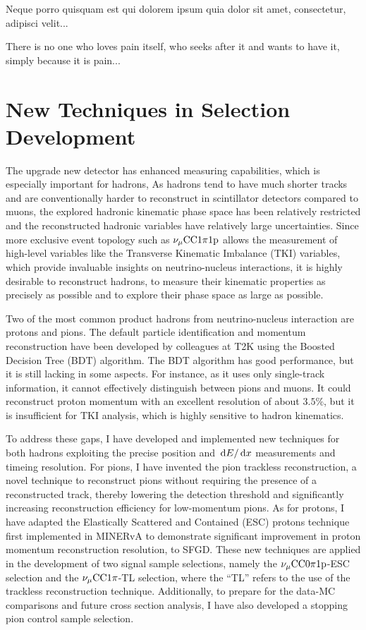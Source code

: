 \begin{savequote}[8cm]
\textlatin{Neque porro quisquam est qui dolorem ipsum quia dolor sit amet, consectetur, adipisci velit...}

There is no one who loves pain itself, who seeks after it and wants to have it, simply because it is pain...
\end{savequote}

\chapter{\label{ch:4-sel}New Techniques in Selection Development} 
\minitoc

The upgrade new detector has enhanced measuring capabilities, which is especially important for hadrons,
As hadrons tend to have much shorter tracks and are conventionally harder to reconstruct in scintillator detectors compared to muons, the explored hadronic kinematic phase space has been relatively restricted and the reconstructed hadronic variables have relatively large uncertainties.
Since more exclusive event topology such as $\nu_{\mu}\textrm{CC}1\pi1\textrm{p}$ allows the measurement of high-level variables like the Transverse Kinematic Imbalance (TKI) variables, which provide invaluable insights on neutrino-nucleus interactions, it is highly desirable to reconstruct hadrons, to measure their kinematic properties as precisely as possible and to explore their phase space as large as possible.

Two of the most common product hadrons from neutrino-nucleus interaction are protons and pions. 
The default particle identification and momentum reconstruction have been developed by colleagues at T2K using the Boosted Decision Tree (BDT) algorithm. The BDT algorithm has good performance, but it is still lacking in some aspects.
For instance, as it uses only single-track information, it cannot effectively distinguish between pions and muons. 
It could reconstruct proton momentum with an excellent resolution of about $3.5\%$, but it is insufficient for TKI analysis, which is highly sensitive to hadron kinematics. 

To address these gaps, I have developed and implemented new techniques for both hadrons exploiting the precise position and $\,\textrm{d}E/\,\textrm{d}x$ measurements and timeing resolution.
For pions, I have invented the pion trackless reconstruction, a novel technique to reconstruct pions without requiring the presence of a reconstructed track, thereby lowering the detection threshold and significantly increasing reconstruction efficiency for low-momentum pions. 
As for protons, I have adapted the Elastically Scattered and Contained (ESC) protons technique~\cite{Lu:2016mjf} first implemented in MINERvA to demonstrate significant improvement in proton momentum reconstruction resolution, to SFGD. 
These new techniques are applied in the development of two signal sample selections, namely the $\nu_{\mu}\textrm{CC}0\pi1\textrm{p}$-ESC selection and the $\nu_{\mu}\textrm{CC}1\pi$-TL selection, where the ``TL'' refers to the use of the trackless reconstruction technique.
Additionally, to prepare for the data-MC comparisons and future cross section analysis, I have also developed a stopping pion control sample selection.

